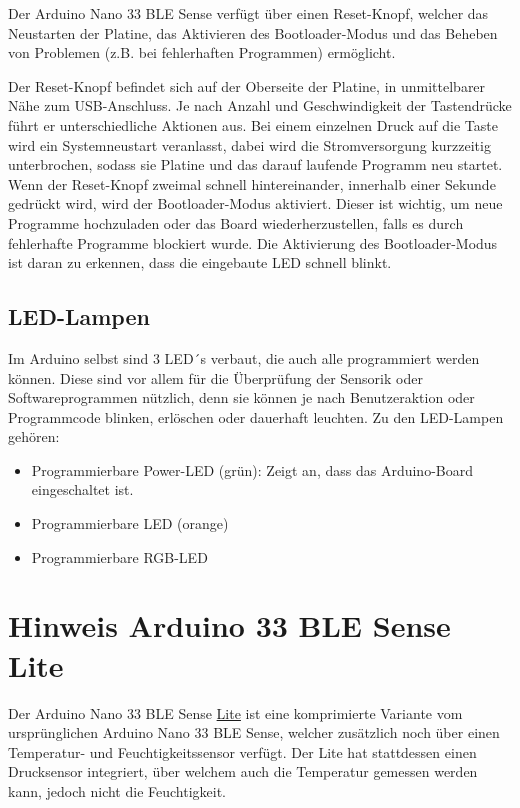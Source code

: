 Der Arduino Nano 33 BLE Sense verfügt über einen Reset-Knopf, welcher das Neustarten der Platine, das Aktivieren des Bootloader-Modus und das Beheben von Problemen (z.B. bei fehlerhaften Programmen) ermöglicht.

Der Reset-Knopf befindet sich auf der Oberseite der Platine, in unmittelbarer Nähe zum USB-Anschluss. Je nach Anzahl und Geschwindigkeit der Tastendrücke führt er unterschiedliche Aktionen aus. Bei einem einzelnen Druck auf die Taste wird ein Systemneustart veranlasst, dabei wird die Stromversorgung kurzzeitig unterbrochen, sodass sie Platine und das darauf laufende Programm neu startet. Wenn der Reset-Knopf zweimal schnell hintereinander, innerhalb einer Sekunde gedrückt wird, wird der Bootloader-Modus aktiviert. Dieser ist wichtig, um neue Programme hochzuladen oder das Board wiederherzustellen, falls es durch fehlerhafte Programme blockiert wurde. Die Aktivierung des Bootloader-Modus ist daran zu erkennen, dass die eingebaute LED schnell blinkt.\cite{Ard.2024}

\subsection{LED-Lampen}

Im Arduino selbst sind 3 LED´s verbaut, die auch alle programmiert werden können. Diese sind vor allem für die Überprüfung der Sensorik oder Softwareprogrammen nützlich, denn sie können je nach Benutzeraktion oder Programmcode blinken, erlöschen oder dauerhaft leuchten. Zu den LED-Lampen gehören: 
	\begin{itemize}
		\item Programmierbare Power-LED (grün): Zeigt an, dass das Arduino-Board eingeschaltet ist.
		\item Programmierbare LED (orange)
		\item Programmierbare RGB-LED
		\\ \cite{Ard.2024}
	\end{itemize}

\section{Hinweis Arduino 33 BLE Sense Lite \label{Hinweis Arduino 33 BLE Sense Lite}}

Der Arduino Nano 33 BLE Sense \underline{Lite} ist eine komprimierte Variante vom ursprünglichen Arduino Nano 33 BLE Sense, welcher zusätzlich noch über einen Temperatur- und Feuchtigkeitssensor verfügt. Der Lite hat stattdessen einen Drucksensor integriert, über welchem auch die Temperatur gemessen werden kann, jedoch nicht die Feuchtigkeit.\cite{PetrFilipi.2022}


